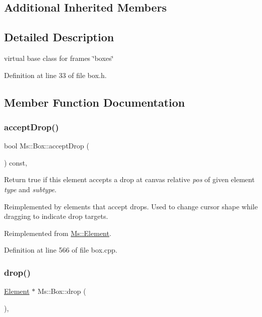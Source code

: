 \subsection*{Additional Inherited Members}


\subsection{Detailed Description}
virtual base class for frames \char`\"{}boxes\char`\"{} 

Definition at line 33 of file box.\+h.



\subsection{Member Function Documentation}
\mbox{\label{class_ms_1_1_box_adea5343e08360e710da1b62a55e61c28}} 
\subsubsection{\texorpdfstring{accept\+Drop()}{acceptDrop()}}
{\footnotesize\ttfamily bool Ms\+::\+Box\+::accept\+Drop (\begin{DoxyParamCaption}\item[{\hyperlink{class_ms_1_1_edit_data}{Edit\+Data} \&}]{ }\end{DoxyParamCaption}) const\hspace{0.3cm}{\ttfamily [override]}, {\ttfamily [virtual]}}

Return true if this element accepts a drop at canvas relative {\itshape pos} of given element {\itshape type} and {\itshape subtype}.

Reimplemented by elements that accept drops. Used to change cursor shape while dragging to indicate drop targets. 

Reimplemented from \hyperlink{class_ms_1_1_element_a35614445f0bc2212cbcc75c3f5810543}{Ms\+::\+Element}.



Definition at line 566 of file box.\+cpp.

\mbox{\label{class_ms_1_1_box_ac1ec659f101990a90822f10edccdc2e6}} 
\subsubsection{\texorpdfstring{drop()}{drop()}}
{\footnotesize\ttfamily \hyperlink{class_ms_1_1_element}{Element} $\ast$ Ms\+::\+Box\+::drop (\begin{DoxyParamCaption}\item[{\hyperlink{class_ms_1_1_edit_data}{Edit\+Data} \&}]{ }\end{DoxyParamCaption})\hspace{0.3cm}{\ttfamily [override]}, {\ttfamily [virtual]}}

